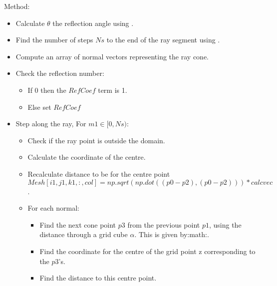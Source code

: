 \documentclass[letterpaper,10pt,english]{sphinxmanual}
\begin{document}
\begin{fulllineitems}
\begin{fulllineitems}
\begin{quote}
\begin{description}
\end{description}\end{quote}

Method:
\begin{itemize}
\item {} 
Calculate \(\theta\) the reflection angle using     .

\item {} 
Find the number of steps \(Ns\) to the end of the ray segment     using .

\item {} 
Compute an array of normal vectors representing the ray cone.

\item {} 
Check the reflection number:
\begin{itemize}
\item {} 
If 0 then the \(RefCoef\) term is 1.

\item {} 
Else set \(RefCoef\)

\end{itemize}

\item {} 
Step along the ray, For \(m1\in[0,Ns):\)
\begin{itemize}
\item {} 
Check if the ray point is outside the domain.

\item {} 
Calculate the co\sphinxhyphen{}ordinate of the centre.

\item {} 
Recalculate distance to be for the centre point       \(Mesh[i1,j1,k1,:,col]=np.sqrt(np.dot((p0-p2),(p0-p2)))*calcvec\).

\item {} 
For each normal:
\begin{itemize}
\item {} 
Find the next cone point \(p3\) from the previous point         \(p1\), using the distance through a grid cube         \(\alpha\). This is given by:math:.

\item {} 
Find the co\sphinxhyphen{}ordinate for the centre of the grid point z         corresponding to the \(p3\)’s.

\item {} 
Find the distance to this centre point.


\end{itemize}
\end{itemize}
\end{itemize}
\end{fulllineitems}
\end{fulllineitems}
\end{document}
